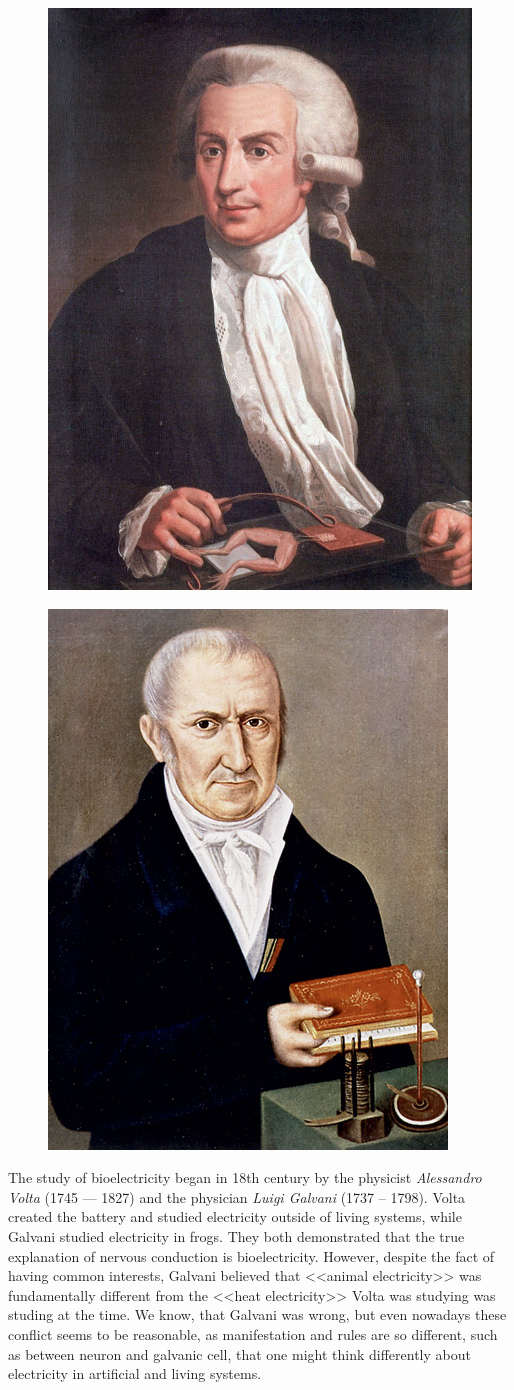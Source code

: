 \documentclass[14pt,a4paper]{scrartcl}
\begin{document}
\begin{figure}[H]
\centering
\begin{minipage}{.5\textwidth}
  \centering
  \includegraphics[width=0.5\linewidth]{Galvani}
  \label{fig:Galvani}
\end{minipage}%
\begin{minipage}{.5\textwidth}
  \centering
  \includegraphics[width=0.5\linewidth]{Volta}
  \label{fig:Volta}
\end{minipage}
\end{figure}

The study of bioelectricity began in 18th century by the physicist \textit{Alessandro Volta} (1745 — 1827) and the physician \textit{Luigi Galvani} (1737 – 1798). Volta created the battery and studied electricity outside of living systems, while Galvani studied electricity in frogs. They both demonstrated that the true explanation of nervous conduction is bioelectricity. However, despite the fact of having common interests, Galvani believed that <<animal electricity>> was fundamentally different from the <<heat electricity>> Volta was studying was studing at the time. We know, that Galvani was wrong, but even nowadays these conflict seems to be reasonable, as manifestation and rules are so different, such as between neuron and galvanic cell, that one might think differently about electricity in artificial and living systems.
\end{document}
